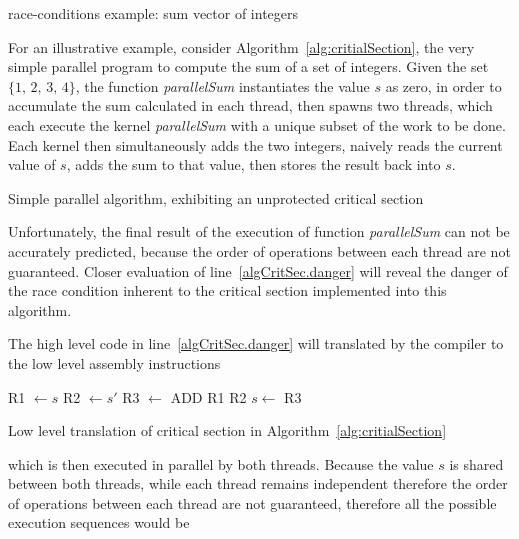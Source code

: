 race-conditions
example: sum vector of integers

For an illustrative example, consider Algorithm~\ref{alg:critialSection}, the very simple parallel program to compute the sum of a set of integers. Given the set $\{1,\,2,\,3,\,4\}$, the function \textit{parallelSum} instantiates the value $s$ as zero, in order to accumulate the sum calculated in each thread, then spawns two threads, which each execute the kernel \textit{parallelSum} with a unique subset of the work to be done. Each kernel then simultaneously adds the two integers, naively reads the current value of $s$, adds the sum to that value, then stores the result back into $s$.

\begin{algorithm}[ht]
	\DontPrintSemicolon


	\bigskip
\nl	{}

	\bigskip
\nl	{}
	\caption{Simple parallel algorithm, exhibiting an unprotected critical section \label{alg:critialSection}}
\end{algorithm}%

Unfortunately, the final result of the execution of function \textit{parallelSum} can not be accurately predicted, because the order of operations between each thread are not guaranteed. Closer evaluation of line~\ref{algCritSec.danger} will reveal the danger of the race condition inherent to the critical section implemented into this algorithm.

The high level code in line~\ref{algCritSec.danger} will translated by the compiler to the low level assembly instructions
%
\begin{algorithm}[ht]
	\DontPrintSemicolon
\nl	R1 $\leftarrow s$\;
\nl	R2 $\leftarrow s'$\;
\nl R3 $\leftarrow$ ADD R1 R2\;
\nl	$s \leftarrow$ R3\;
	\caption{Low level translation of critical section in Algorithm~\ref{alg:critialSection} \label{alg:critialSectionLowLevel}}
\end{algorithm}%
%
which is then executed in parallel by both threads. Because the value $s$ is shared between both threads, while each thread remains independent therefore the order of operations between each thread are not guaranteed, therefore all the possible execution sequences would be %



